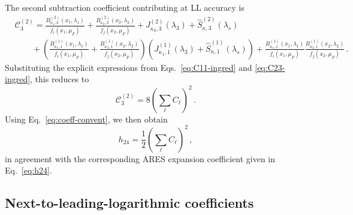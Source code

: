 The second subtraction coefficient contributing at LL accuracy is
\begin{equation}
\begin{aligned}
	&\mathcal{C}^{(2)}_3=\frac{B_{\kappa_1,3}^{(2)}(x_1,\lambda_1)}{f_i(x_1,\mu_F)}+\frac{B_{\kappa_2,3}^{(2)}(x_2,\lambda_2)}{f_j(x_2,\mu_F)}+
    J_{\kappa_3,3}^{(2)}(\lambda_3)
    +\widehat{S}^{(2)}_{\kappa,3}\left(\lambda_s\right)\\[0.5ex]
    &\qquad +\left(\frac{B^{(1)}_{\kappa_1,1}(x_1,\lambda_1)}{f_i(x_1,\mu_F)}+\frac{B^{(1)}_{\kappa_2,1}(x_2,\lambda_2)}{f_j(x_2,\mu_F)}\right)\left(J_{\kappa_1,1}^{(1)}(\lambda_3)+\widehat{S}_{\kappa,1}^{(1)}(\lambda_s)\right)+\frac{B^{(1)}_{\kappa_1,1}(x_1,\lambda_1)}{f_i(x_1,\mu_F)}\frac{B^{(1)}_{\kappa_2,1}(x_2,\lambda_2)}{f_j(x_2,\mu_F)}\,.
 \end{aligned}   
\end{equation}
Substituting the explicit expressions from
Eqs.~\eqref{eq:C11-ingred} and \eqref{eq:C23-ingred}, this reduces to
\begin{equation}
    \mathcal{C}^{(2)}_3=8\left(\sum_{\ell}C_{\ell}\right)^2\,.
\end{equation}
Using Eq.~\eqref{eq:coeff-convent}, we then obtain
\begin{equation}
    h_{24}=\frac{1}{2}\left(\sum_{\ell}C_{\ell}\right)^2\,,
\end{equation}
in agreement with the corresponding \textsc{ARES} expansion coefficient
given in Eq.~\eqref{eq:h24}.

\subsection{Next-to-leading-logarithmic coefficients}
\label{subsec:NLL-coeff}

